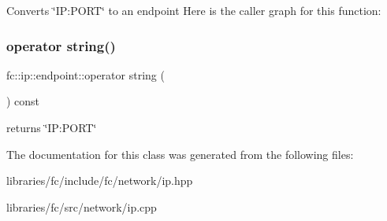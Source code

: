 Converts \char`\"{}\+I\+P\+:\+P\+O\+R\+T\char`\"{} to an endpoint Here is the caller graph for this function\+:
\mbox{\label{classfc_1_1ip_1_1endpoint_a8a44fd8cffdec158ae2a548db5d64a56}} 
\subsubsection{\texorpdfstring{operator string()}{operator string()}}
{\footnotesize\ttfamily fc\+::ip\+::endpoint\+::operator string (\begin{DoxyParamCaption}{ }\end{DoxyParamCaption}) const}

returns \char`\"{}\+I\+P\+:\+P\+O\+R\+T\char`\"{} 

The documentation for this class was generated from the following files\+:\begin{DoxyCompactItemize}
\item 
libraries/fc/include/fc/network/ip.\+hpp\item 
libraries/fc/src/network/ip.\+cpp\end{DoxyCompactItemize}
